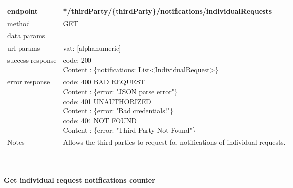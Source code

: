 \begin{legal}
\begin{legal}
\begin{itemize}
								\begin{tabularx}{\linewidth}{| l| l }
									\hline
									endpoint & */thirdParty/\{thirdParty\}/notifications/individualRequests \\
									\hline
									method & GET \\
									\hline
									data params & \\
									\hline
									url params &
									\parbox{0.7\textwidth}{
										\bigskip
										vat: [alphanumeric]
										\bigskip
									} \\
									\hline
									success response &
									\parbox{0.7\textwidth}{
										\bigskip
										code: 200\\
										Content : \{notifications: List<IndividualRequest>\}
										\bigskip
									} \\
									\hline
									error response &
									\parbox{0.7\textwidth}{
										\bigskip
										code: 400 BAD REQUEST \\
										Content : \{error: "JSON parse error"\}\\
										code: 401 UNAUTHORIZED \\
										Content : \{error: "Bad credentials!"\}\\
										code: 404 NOT FOUND \\
										Content : \{error: "Third Party Not Found"\}
										\bigskip
									} \\
									\hline
									Notes & 
									\parbox{0.7\textwidth}{
										\bigskip Allows the third parties to request for notifications of individual requests.
									\bigskip}  \\
									\hline
								\end{tabularx}\\\\
								
								\textbf{Get individual request notifications counter} \\
			

\end{itemize}
\end{legal}
\end{legal}
